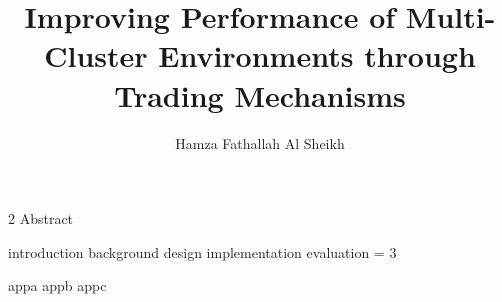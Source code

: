 \documentclass[11pt,Chicago]{uuthesis2e}
\author                 {Hamza Fathallah Al Sheikh}
\title                  {Improving Performance of Multi-Cluster Environments through Trading Mechanisms}
\begin{document}
\frontmatterformat
\titlepage
\copyrightpage
\dissertationapproval
\setcounter {page}     {2}             %
 {Abstract}
\dedicationpage
\tableofcontents
\listoffigures
\listoftables
%

 {}




\maintext       %

\pagestyle{headings} %

 {introduction}
 {background}
 {design}
 {implementation}
 {evaluation}
\numberofappendices = 3
\appendix       %

 {appa}
 {appb}
 {appc}
\end{document}
